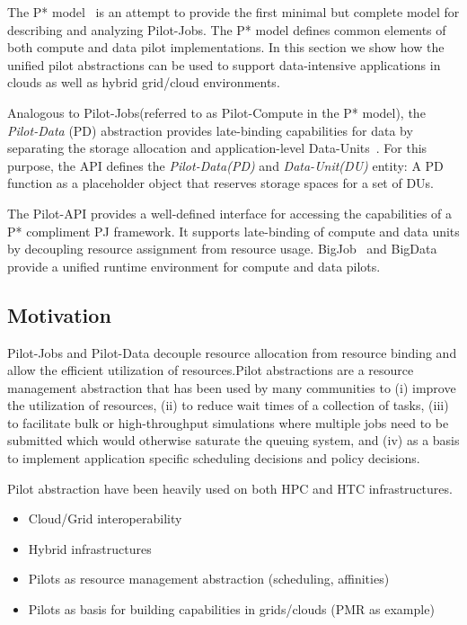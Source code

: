 \documentclass[times]{cpeauth}
\newcommand{\pilot}{Pilot\xspace}
\newcommand{\pilotjobs}{Pilot-Jobs\xspace}
\newcommand{\pilotcompute}{Pilot-Compute\xspace}
\newcommand{\pilotdata}{Pilot-Data\xspace}
\newcommand{\pd}{PD\xspace}
\newcommand{\dataunit}{Data-Unit\xspace}
\newcommand{\dataunits}{Data-Units\xspace}
\newcommand{\dus}{DUs\xspace}
\begin{document}
The P* model~\cite{pstar12} is an attempt to provide the first minimal but
complete model for describing and analyzing \pilotjobs. The P* model defines
common elements of both compute and data pilot implementations. In this 
section we show how the unified pilot abstractions can be used to support 
data-intensive applications in clouds as well as hybrid grid/cloud 
environments.

Analogous to \pilotjobs (referred to as \pilotcompute in the P* model), the
{\it Pilot-Data} (PD) abstraction provides late-binding capabilities for data
by separating the storage allocation and application-level
\dataunits~\cite{pstar12}. For this purpose, the API defines the {\it
\pilotdata (PD)} and {\it \dataunit (DU)} entity: A \pd function as a
placeholder object that reserves storage spaces for a set of \dus. 

The \pilot-API provides a well-defined interface for accessing the
capabilities of a P* compliment PJ framework. It supports late-binding of
compute and data units by decoupling resource assignment from resource usage.
BigJob~\cite{saga_bigjob_condor_cloud} and 
BigData~\cite{Mantha:2012:PEF:2287016.2287020} provide a unified runtime 
environment for compute and data pilots.



\subsection{Motivation}

\pilotjobs and \pilotdata decouple resource allocation from resource binding
and allow the efficient utilization of resources.\pilot abstractions are a
resource management abstraction that has been used by many communities to (i)
improve the utilization of resources, (ii) to reduce wait times of a
collection of tasks, (iii) to facilitate bulk or high-throughput simulations
where multiple jobs need to be submitted which would otherwise saturate the
queuing system, and (iv) as a basis to implement application specific
scheduling decisions and policy decisions.


Pilot abstraction have been heavily used on both HPC and HTC infrastructures. 
\begin{itemize}
	\item Cloud/Grid interoperability
	\item Hybrid infrastructures 
	\item Pilots as resource management abstraction (scheduling, affinities)
	\item Pilots as basis for building capabilities in grids/clouds (PMR as 
	example)
\end{itemize}
\end{document}
